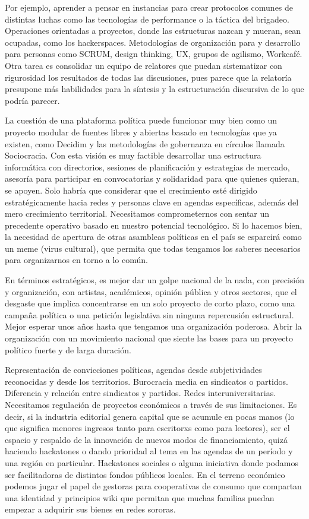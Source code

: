 Por ejemplo, aprender a pensar en instancias para crear protocolos comunes de distintas luchas como las tecnologías de performance o la táctica del brigadeo. Operaciones orientadas a proyectos, donde las estructuras nazcan y mueran, sean ocupadas, como los hackerspaces. Metodologías de organización para y desarrollo para personas como SCRUM, design thinking, UX, grupos de agilismo, Workcafé. Otra tarea es consolidar un equipo de relatores que puedan sistematizar con rigurosidad los resultados de todas las discusiones, pues parece que la relatoría presupone más habilidades para la síntesis y la estructuración discursiva de lo que podría parecer.

La cuestión de una plataforma política puede funcionar muy bien como un proyecto modular de fuentes libres y abiertas basado en tecnologías que ya existen, como Decidim y las metodologías de gobernanza en círculos llamada Sociocracia. Con esta visión es muy factible desarrollar una estructura informática con directorios, sesiones de planificación y estrategias de mercado, asesoría para participar en convocatorias y solidaridad para que quienes quieran, se apoyen. Solo habría que considerar que el crecimiento esté dirigido estratégicamente hacia redes y personas clave en agendas específicas, además del mero crecimiento territorial. Necesitamos comprometernos con sentar un precedente operativo basado en nuestro potencial tecnológico. Si lo hacemos bien, la necesidad de apertura de otras asambleas políticas en el país se esparcirá como un meme (virus cultural), que permita que todas tengamos los saberes necesarios para organizarnos en torno a lo común.

En términos estratégicos, es mejor dar un golpe nacional de la nada, con precisión y organización, con artistas, académicos, opinión pública y otros sectores, que el desgaste que implica concentrarse en un solo proyecto de corto plazo, como una campaña política o una petición legislativa sin ninguna repercusión estructural. Mejor esperar unos años hasta que tengamos una organización poderosa. Abrir la organización con un movimiento nacional que siente las bases para un proyecto político fuerte y de larga duración.

Representación de convicciones políticas, agendas desde subjetividades reconocidas y desde los territorios. Burocracia media en sindicatos o partidos. Diferencia y relación entre sindicatos y partidos. Redes interuniversitarias. Necesitamos regulación de proyectos económicos a través de sus limitaciones. Es decir, si la industria editorial genera capital que se acumule en pocas manos (lo que significa menores ingresos tanto para escritorxs como para lectores), ser el espacio y respaldo de la innovación de nuevos modos de financiamiento, quizá haciendo hackatones o dando prioridad al tema en las agendas de un período y una región en particular. Hackatones sociales o alguna iniciativa donde podamos ser facilitadoras de distintos fondos públicos locales. En el terreno económico podemos jugar el papel de gestoras para cooperativas de consumo que compartan una identidad y principios wiki que permitan que muchas familias puedan empezar a adquirir sus bienes en redes sororas.


